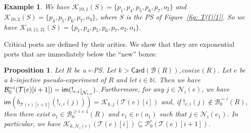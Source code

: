\documentclass{article}
\theoremstyle{plain}
\newtheorem{example}{Example}
\newtheorem{prop}[theorem]{Proposition}
\newcommand{\Nat}{\ensuremath{\mathbb{N}}}
\newcommand{\taylor}[2]{\mathcal{T}(#1)[#2]}
\newcommand{\criticalports}[3]{\mathcal{K}_{#2, #3}(#1)}
\newcommand{\cosize}[1]{\textit{cosize}(#1)}
\def\restriction#1#2{\mathchoice
              {\setbox1\hbox{${\displaystyle #1}_{\scriptstyle #2}$}
              \restrictionaux{#1}{#2}}
              {\setbox1\hbox{${\textstyle #1}_{\scriptstyle #2}$}
              \restrictionaux{#1}{#2}}
              {\setbox1\hbox{${\scriptstyle #1}_{\scriptscriptstyle #2}$}
              \restrictionaux{#1}{#2}}
              {\setbox1\hbox{${\scriptscriptstyle #1}_{\scriptscriptstyle #2}$}
              \restrictionaux{#1}{#2}}}
\def\restrictionaux#1#2{{#1\,\smash{\vrule height .8\ht1 depth .85\dp1}}_{\,#2}}
\newcommand{\im}[1]{\textsf{im}(#1)}
\newcommand{\Card}[1]{\textsf{Card}\left( #1 \right)}
\newcommand{\exponentialportsatzero}[1]{\mathcal{P}_0^\textit{e}(#1)}
\newcommand{\boxes}[1]{\mathcal{B}(#1)}
\newcommand{\exactboxesatzero}[2]{\mathcal{B}_{0}^{=#2}(#1)}
\newcommand{\boxesatzerogeq}[2]{\mathcal{B}_0^{\geq #2}(#1)}
\begin{document}
\begin{example}
We have $\criticalports{S}{10}{1} = \{ p_1, p_4, p_5, p_6, p_7, o_2 \}$ and $\criticalports{S}{10}{2} = \{ p_4, p_5, p_6, p_7, o_4 \}$, where $S$ is the PS of Figure~\ref{fig: T(f)[1]}. So we have $\criticalports{S}{10}{\{ 1, 2\}} = \{ p_1, p_4, p_5, p_6, p_7, o_2, o_4 \}$.
\end{example}



Critical ports are defined by their arities. We show that they are exponential ports that are immediately below the ``new'' boxes:

\begin{prop}\label{prop: critical ports below new boxes}
Let $R$ be a $\circ$-PS. 
Let $k > \Card{\boxes{R}{}}, \cosize{R}$. Let $e$ be a $k$-injective pseudo-experiment of $R$ and let $i \in \Nat$. Then we have $\exactboxesatzero{\taylor{e}{i+1}}{i} = \im{\restriction{!_{e, i}}{\mathcal{N}_{i, e}}}$. Furthermore, for any $j \in \mathcal{N}_i(e)$, we have $\im{b_{\taylor{e}{i+1}}(!_{e, i}(j))} = \criticalports{\taylor{e}{i}}{k}{j}$ and, if $!_{e, i}(j) \notin \exactboxesatzero{R}{i}$, then there exist $o_1 \in \boxesatzerogeq{R}{i+1}$ and $e_1 \in e(o_1)$ such that $j \in \mathcal{N}_i(e_1)$. In particular, we have $\criticalports{\taylor{e}{i}}{k}{\mathcal{N}_i(e)} \subseteq \exponentialportsatzero{\taylor{e}{i+1}}$.
\end{prop}
\end{document}
